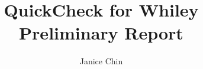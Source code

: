 \documentclass[11pt
              , a4paper
              , oneside
              , openright
              ]{article}
\title{QuickCheck for Whiley Preliminary Report}
\author{Janice Chin}
\date{}
\begin{document}
\frontmatter



\begin{abstract}

\end{abstract}


\maketitle

\tableofcontents



\mainmatter










\backmatter




%


\appendix


\end{document}
